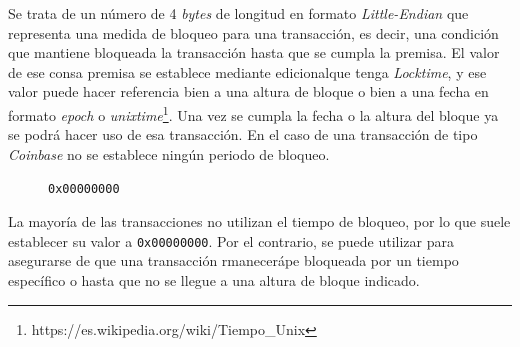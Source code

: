 \documentclass{article}
\begin{document}
    Se trata de un número de 4 \textit{bytes} de longitud en formato \textit{Little-Endian} que representa una medida de bloqueo para una transacción, es decir, una condición que mantiene bloqueada la transacción hasta que se cumpla la premisa. El valor  de ese consa premisa se establece mediante edicionalque tenga \textit{Locktime}, y ese valor puede hacer referencia bien a una altura de bloque o bien a una fecha en formato \textit{epoch} o \textit{unixtime}\footnote{https://es.wikipedia.org/wiki/Tiempo\_Unix}. Una vez se cumpla la fecha o la altura del bloque ya se podrá hacer uso de esa transacción. En el caso de una transacción de tipo \textit{Coinbase} no se establece ningún periodo de bloqueo.
    \begin{figure}[H]
        \texttt{0x00000000}
    \end{figure}
    
    La mayoría de las transacciones no utilizan el tiempo de bloqueo, por lo que suele establecer su valor a \texttt{0x00000000}. Por el contrario, se puede utilizar para asegurarse de que una transacción rmanecerápe bloqueada por un tiempo específico o hasta que no se llegue a una altura de bloque indicado.
    
\end{document}
